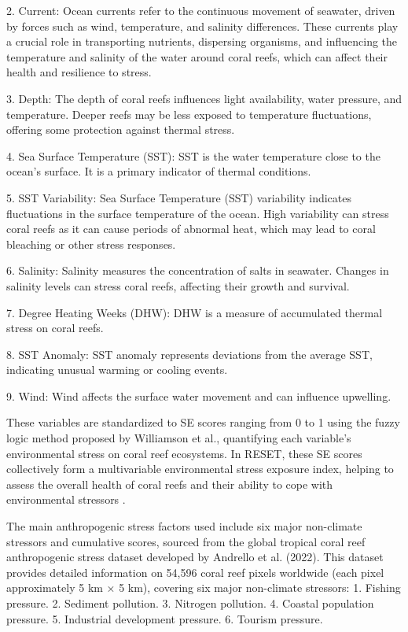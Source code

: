 \documentclass[a4paper, 11]{article}
\begin{document}
2. Current: Ocean currents refer to the continuous movement of seawater, driven by forces such as wind, temperature, and salinity differences. These currents play a crucial role in transporting nutrients, dispersing organisms, and influencing the temperature and salinity of the water around coral reefs, which can affect their health and resilience to stress. 

3. Depth: The depth of coral reefs influences light availability, water pressure, and temperature. Deeper reefs may be less exposed to temperature fluctuations, offering some protection against thermal stress.

4. Sea Surface Temperature (SST): SST is the water temperature close to the ocean's surface. It is a primary indicator of thermal conditions.

5. SST Variability: Sea Surface Temperature (SST) variability indicates fluctuations in the surface temperature of the ocean. High variability can stress coral reefs as it can cause periods of abnormal heat, which may lead to coral bleaching or other stress responses. 

6. Salinity: Salinity measures the concentration of salts in seawater. Changes in salinity levels can stress coral reefs, affecting their growth and survival.

7. Degree Heating Weeks (DHW): DHW is a measure of accumulated thermal stress on coral reefs.

8. SST Anomaly: SST anomaly represents deviations from the average SST, indicating unusual warming or cooling events. 

9. Wind: Wind affects the surface water movement and can influence upwelling.

These variables are standardized to SE scores ranging from 0 to 1 using the fuzzy logic method proposed by Williamson et al., quantifying each variable's environmental stress on coral reef ecosystems. In RESET, these SE scores collectively form a multivariable environmental stress exposure index, helping to assess the overall health of coral reefs and their ability to cope with environmental stressors \citep{williamson2022monitoring}.

The main anthropogenic stress factors used include six major non-climate stressors and cumulative scores, sourced from the global tropical coral reef anthropogenic stress dataset developed by Andrello et al. (2022). This dataset provides detailed information on 54,596 coral reef pixels worldwide (each pixel approximately 5 km × 5 km), covering six major non-climate stressors:
1. Fishing pressure. 
2. Sediment pollution.
3. Nitrogen pollution.
4. Coastal population pressure.
5. Industrial development pressure.
6. Tourism pressure.
\end{document}
